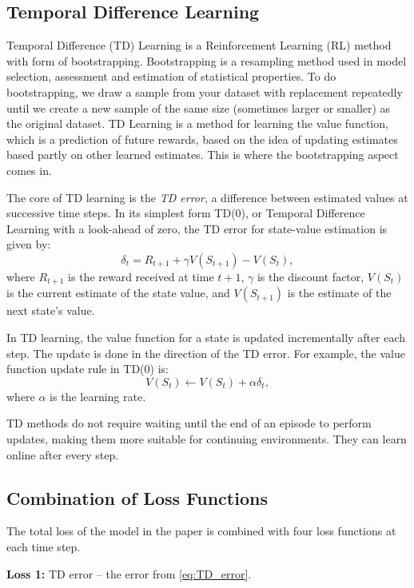 \documentclass[12pt,letterpaper,oneside]{article}
\begin{document}
\subsection{Temporal Difference Learning}
	Temporal Difference (TD) Learning is a Reinforcement Learning (RL) method with form of bootstrapping. Bootstrapping is a resampling method used in model selection, assessment and estimation of statistical properties. To do bootstrapping, we draw a sample from your dataset with replacement repeatedly until we create a new sample of the same size (sometimes larger or smaller) as the original dataset. TD Learning is a method for learning the value function, which is a prediction of future rewards, based on the idea of updating estimates based partly on other learned estimates. This is where the bootstrapping aspect comes in.
	
	The core of TD learning is the \textit{TD error}, a difference between estimated values at successive time steps. In its simplest form TD(0), or Temporal Difference Learning with a look-ahead of zero, the TD error for state-value estimation is given by:
	\begin{equation}\label{eq:TD_error}
		\delta_t = R_{t+1} + \gamma V(S_{t+1}) - V(S_t),
	\end{equation}
	where \( R_{t+1} \) is the reward received at time \( t+1 \), \( \gamma \) is the discount factor, \( V(S_t) \) is the current estimate of the state value, and \( V(S_{t+1}) \) is the estimate of the next state's value.
	
	In TD learning, the value function for a state is updated incrementally after each step. The update is done in the direction of the TD error. For example, the value function update rule in TD(0) is:
	\begin{equation}
		V(S_t) \leftarrow V(S_t) + \alpha \delta_t,
	\end{equation}
	where \( \alpha \) is the learning rate.
	
	TD methods do not require waiting until the end of an episode to perform updates, making them more suitable for continuing environments. They can learn online after every step.
	
\subsection{Combination of Loss Functions}
	The total loss of the model in the paper is combined with four loss functions at each time step.
	
	\textbf{Loss 1: } TD error -- the error from \autoref{eq:TD_error}.
	
\end{document}
